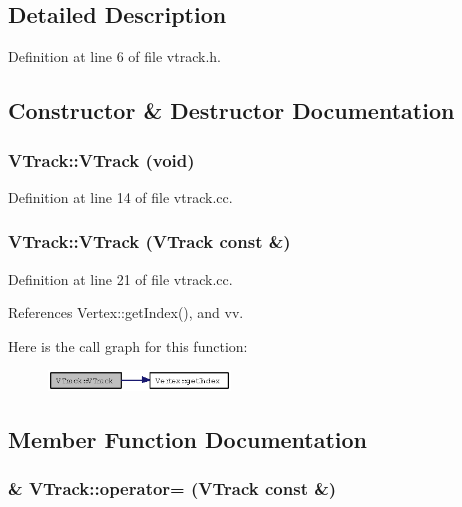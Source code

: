 \subsection{Detailed Description}




Definition at line 6 of file vtrack.h.

\subsection{Constructor \& Destructor Documentation}
\subsubsection{\setlength{\rightskip}{0pt plus 5cm}VTrack::VTrack (void)}\label{classVTrack_70105fe97cc4d64bf6c594145b889083}




Definition at line 14 of file vtrack.cc.
\subsubsection{\setlength{\rightskip}{0pt plus 5cm}VTrack::VTrack ({\bf VTrack} const \&)}\label{classVTrack_9ccc41f55cda6014ad427c6aecab37d7}




Definition at line 21 of file vtrack.cc.

References Vertex::get\-Index(), and vv.

Here is the call graph for this function:\begin{figure}[H]
\begin{center}
\leavevmode
\includegraphics[width=137pt]{classVTrack_9ccc41f55cda6014ad427c6aecab37d7_cgraph}
\end{center}
\end{figure}


\subsection{Member Function Documentation}
\subsubsection{ \& VTrack::operator= ({\bf VTrack} const \&)}\label{classVTrack_9b0cc4eb615943338033f9d07fd52e48}




